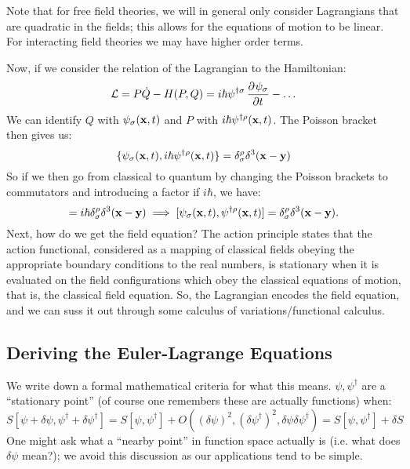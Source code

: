 Note that for free field theories, we will in general only consider Lagrangians that are quadratic in the fields; this allows for the equations of motion to be linear. For interacting field theories we may have higher order terms. 

Now, if we consider the relation of the Lagrangian to the Hamiltonian:
\begin{equation}
    \L = P\dot{Q} - H(P, Q) =  i\hbar\psi^{\dag\sigma}\dpd{\psi_\sigma}{t} - \ldots
\end{equation}
We can identify $Q$ with $\psi_{\sigma}(\mathbf{x}, t)$ and $P$ with $i\hbar \psi^{\dagger\rho}(\mathbf{x}, t)$. The Poisson bracket then gives us:
\begin{equation}
    \{\psi_{\sigma}(\mathbf{x}, t), i\hbar\psi^{\dagger\rho}(\mathbf{x}, t)\} = \delta_{\sigma}^\rho \delta^3(\mathbf{x} - \mathbf{y})
\end{equation}
So if we then go from classical to quantum by changing the Poisson brackets to commutators and introducing a factor if $i\hbar$, we have:
\begin{equation}
    [\psi_{\sigma}(\v{x}, t), i\hbar\psi^{\dag\rho}(\v{x}, t)] = i\hbar\delta_{\sigma}^\rho \delta^3(\v{x} - \v{y}) \implies [\psi_{\sigma}(\v{x}, t), \psi^{\dag\rho}(\v{x}, t)] = \delta_{\sigma}^\rho \delta^3(\v{x} - \v{y}).
\end{equation}
Next, how do we get the field equation? The action principle states that the action functional, considered as a mapping of classical fields obeying the appropriate boundary conditions to the real numbers, is stationary when it is evaluated on the field configurations which obey the classical equations of motion, that is, the classical field equation. So, the Lagrangian encodes the field equation, and we can suss it out through some calculus of variations/functional calculus.

\subsection{Deriving the Euler-Lagrange Equations}
We write down a formal mathematical criteria for what this means. $\psi, \psi^\dag$ are a ``stationary point'' (of course one remembers these are actually functions) when:
\begin{equation}
    S[\psi + \delta \psi, \psi^\dag + \delta \psi^\dag] = S[\psi, \psi^\dag] + O((\delta\psi)^2, (\delta \psi^{\dag})^{2}, \delta\psi\delta\psi^{\dag}) = S[\psi, \psi^\dag] + \delta S
\end{equation}
One might ask what a ``nearby point'' in function space actually is (i.e. what does $\delta \psi$ mean?); we avoid this discussion as our applications tend to be simple. 

